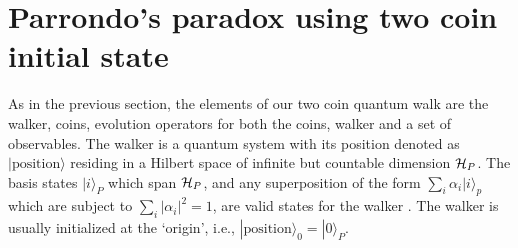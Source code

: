 \documentclass[english,aps,pra,amsmath,amssymb,showpacs,notitlepage,onecolumn]{revtex4-1}
\begin{document}
\section{Parrondo's paradox using two coin initial state}
As in the previous section, the elements of our two coin quantum walk are the walker, coins, evolution operators for both the coins, walker and a set of observables. The walker is a quantum system with its position denoted as 
$|\text{position}\rangle$ residing in a Hilbert space of infinite but countable dimension ${\cal H}_P$. The basis states $|i \rangle_P$ which span ${\cal H}_P$, and any superposition of the form $\sum_{i} \alpha_i|i\rangle_p$ which are subject to $\sum_i|\alpha_i|^2 = 1$, are valid states for the walker \cite{entangled}. The walker is usually initialized at the \lq origin', i.e., $|\text{position}\rangle_0 = |0\rangle_P$.
\end{document}
